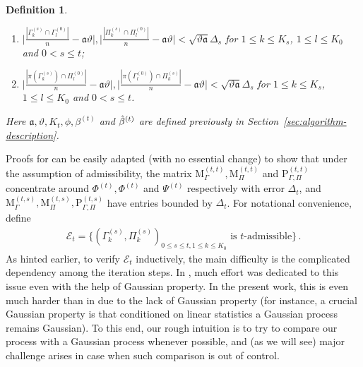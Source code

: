 \documentclass[11pt]{article}
\newtheorem{Definition}[Theorem]{Definition}
\numberwithin{equation}{section}
\begin{document}
\begin{Definition}{\label{def-admissible}}
\begin{enumerate}
    \item[(ix.)] $\Big| \frac{|\Gamma^{(s)}_k \cap \Gamma^{(0)}_{l}|}{n} - \mathfrak{a} \vartheta \Big|, \Big| \frac{|\Pi^{(s)}_k \cap \Pi^{(0)}_{l}|}{n} - \mathfrak{a} \vartheta \Big| < \sqrt{\vartheta \mathfrak{a}} \Delta_s$ for $1\leq k\leq K_s$, $1\leq l\leq K_0$ and $0 < s \leq t$;
    \item[(x.)] $\Big | \frac{| \pi(\Gamma^{(s)}_k) \cap \Pi^{(0)}_{l}|}{n} - \mathfrak{a} \vartheta \Big|, \Big | \frac{| \pi(\Gamma^{(0)}_l) \cap \Pi^{(s)}_{k}|}{n} - \mathfrak{a} \vartheta \Big| < \sqrt{\vartheta \mathfrak{a}} \Delta_s$ for $1\leq k\leq K_s$, $1\leq l\leq K_0$ and $0 < s \leq t$.
\end{enumerate}
Here $\mathfrak{a},\vartheta,K_t,\phi,\beta^{(t)}$ and $\Hat{\beta}^{(t)}$ are defined previously in Section~\ref{sec:algorithm-description}.
\end{Definition}
Proofs for \cite[(3.3)-(3.8)]{DL22+} can be easily adapted (with no essential change) to show that under the assumption of admissibility, the matrix $\mathrm{M}^{(t,t)}_{\Gamma}, \mathrm{M}^{(t,t)}_{\Pi}$ and $ \mathrm{P}^{(t,t)}_{\Gamma,\Pi}$ concentrate around $\Phi^{(t)},\Phi^{(t)}$ and $\Psi^{(t)}$ respectively with error $\Delta_t$, and $\mathrm{M}^{(t,s)}_{\Gamma}, \mathrm{M}^{(t,s)}_{\Pi}, \mathrm{P}^{(t,s)}_{\Gamma,\Pi}$ have entries bounded by $\Delta_t$. For notational convenience, define
\begin{align}
    \mathcal{E}_t = \{  (\Gamma^{(s)}_k,\Pi^{(s)}_k)_{ 0 \leq s \leq t, 1 \leq k \leq K_0 } \mbox{ is $t$-admissible} \}\,. \label{equ-def-admissible}
\end{align}
As hinted earlier, to verify $\mathcal{E}_t$ inductively, the main difficulty is the complicated dependency among the iteration steps. In \cite{DL22+}, much effort was dedicated to this issue even with the help of Gaussian property. In the present work, this is even much harder than in \cite{DL22+} due to the lack of Gaussian property (for instance, a crucial Gaussian property is that conditioned on linear statistics a Gaussian process remains Gaussian). To this end, our rough intuition is to try to compare our process with a Gaussian process whenever possible, and (as we will see) major challenge arises in case when such comparison is out of control.
\end{document}

